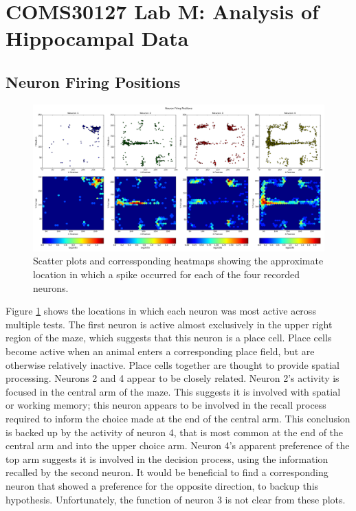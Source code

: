 \documentclass[a4paper, 10pt]{article}
\begin{document}
\section*{COMS30127 Lab M: Analysis of Hippocampal Data}

\subsection*{Neuron Firing Positions}
\begin{figure}[H]
  \centering
  \includegraphics[width=1.0\textwidth]{neuron_pos_plot.png}
  \caption{Scatter plots and corressponding heatmaps showing the approximate location in which a spike occurred for each of the four recorded neurons.}
  \label{fig:posplot}
\end{figure}

Figure \ref{fig:posplot} shows the locations in which each neuron was most
active across multiple tests. The first neuron is active almost exclusively in
the upper right region of the maze, which suggests that this neuron is a place
cell. Place cells become active when an animal enters a corresponding place
field, but are otherwise relatively inactive. Place cells together are thought
to provide spatial processing. Neurons 2 and 4 appear to be closely
related. Neuron 2's activity is focused in the central arm of the maze. This
suggests it is involved with spatial or working memory; this neuron appears to
be involved in the recall process required to inform the choice made at the end
of the central arm. This conclusion is backed up by the activity of neuron 4,
that is most common at the end of the central arm and into the upper choice
arm. Neuron 4's apparent preference of the top arm suggests it is involved in
the decision process, using the information recalled by the second neuron. It
would be beneficial to find a corresponding neuron that showed a preference for
the opposite direction, to backup this hypothesis. Unfortunately, the function
of neuron 3 is not clear from these plots.
\end{document}
